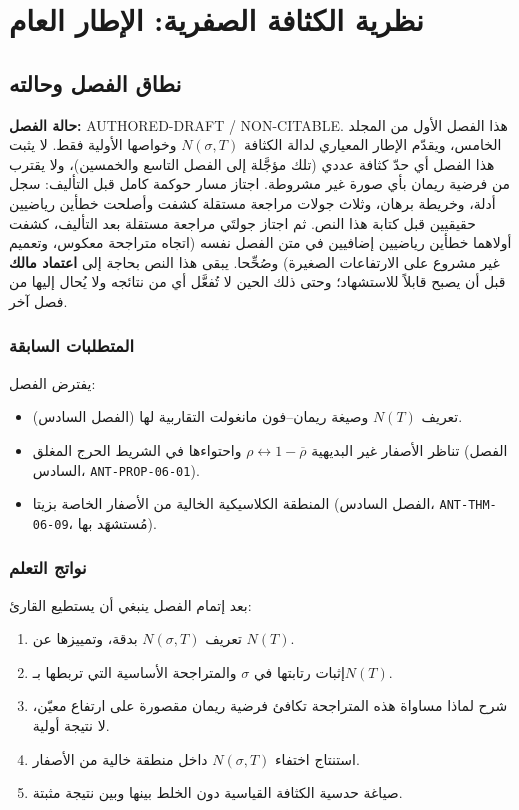 \chapter{نظرية الكثافة الصفرية: الإطار العام}

\section{نطاق الفصل وحالته}

\noindent\textbf{حالة الفصل:} \textenglish{AUTHORED-DRAFT / NON-CITABLE}.
هذا الفصل الأول من المجلد الخامس، ويقدّم الإطار المعياري لدالة الكثافة
\(N(\sigma,T)\) وخواصها الأولية فقط. لا يثبت هذا الفصل أي حدّ كثافة عددي
(تلك مؤجَّلة إلى الفصل التاسع والخمسين)، ولا يقترب من فرضية ريمان بأي صورة غير
مشروطة. اجتاز مسار حوكمة كامل قبل التأليف: سجل أدلة، وخريطة برهان، وثلاث
جولات مراجعة مستقلة كشفت وأصلحت خطأين رياضيين حقيقيين قبل كتابة هذا
النص. ثم اجتاز جولتَي مراجعة مستقلة بعد التأليف، كشفت أولاهما خطأين
رياضيين إضافيين في متن الفصل نفسه (اتجاه متراجحة معكوس، وتعميم غير
مشروع على الارتفاعات الصغيرة) وصُحِّحا. يبقى هذا النص بحاجة إلى
\textbf{اعتماد مالك} قبل أن يصبح قابلاً للاستشهاد؛ وحتى ذلك الحين لا
تُفعَّل أي من نتائجه ولا يُحال إليها من فصل آخر.

\subsection{المتطلبات السابقة}

يفترض الفصل:
\begin{itemize}
  \item تعريف \(N(T)\) وصيغة ريمان–فون مانغولت التقاربية لها (الفصل السادس).
  \item تناظر الأصفار غير البديهية \(\rho\leftrightarrow1-\overline\rho\)
  واحتواءها في الشريط الحرج المغلق (الفصل السادس، \textenglish{\texttt{ANT-PROP-06-01}}).
  \item المنطقة الكلاسيكية الخالية من الأصفار الخاصة بزيتا (الفصل السادس،
  \textenglish{\texttt{ANT-THM-06-09}}، مُستشهَد بها).
\end{itemize}

\subsection{نواتج التعلم}

بعد إتمام الفصل ينبغي أن يستطيع القارئ:
\begin{enumerate}
  \item تعريف \(N(\sigma,T)\) بدقة، وتمييزها عن \(N(T)\).
  \item إثبات رتابتها في \(\sigma\) والمتراجحة الأساسية التي تربطها بـ\(N(T)\).
  \item شرح لماذا مساواة هذه المتراجحة تكافئ فرضية ريمان مقصورة على ارتفاع
  معيّن، لا نتيجة أولية.
  \item استنتاج اختفاء \(N(\sigma,T)\) داخل منطقة خالية من الأصفار.
  \item صياغة حدسية الكثافة القياسية دون الخلط بينها وبين نتيجة مثبتة.
\end{enumerate}

